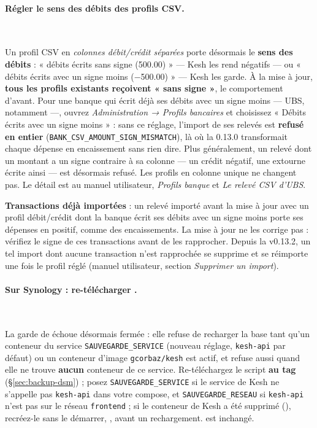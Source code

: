 \documentclass[a4paper,11pt,oneside]{article}
\begin{document}
\paragraph{Régler le sens des débits des profils CSV.}\mbox{}\\
\begin{sloppypar}
Un profil CSV en \emph{colonnes débit/crédit séparées} porte désormais le \textbf{sens des débits} : « débits écrits sans signe (500.00) » --- Kesh les rend négatifs --- ou « débits écrits avec un signe moins (−500.00) » --- Kesh les garde. À la mise à jour, \textbf{tous les profils existants reçoivent « sans signe »}, le comportement d'avant. Pour une banque qui écrit déjà ses débits avec un signe moins --- UBS, notamment ---, ouvrez \emph{Administration → Profils bancaires} et choisissez « Débits écrits avec un signe moins » : sans ce réglage, l'import de ses relevés est \textbf{refusé en entier} (\texttt{BANK\_CSV\_AMOUNT\_SIGN\_MISMATCH}), là où la 0.13.0 transformait chaque dépense en encaissement sans rien dire. Plus généralement, un relevé dont un montant a un signe contraire à sa colonne --- un crédit négatif, une extourne écrite ainsi --- est désormais refusé. Les profils en colonne unique ne changent pas. Le détail est au manuel utilisateur, \emph{Profils banque} et \emph{Le relevé CSV d'UBS}.
\end{sloppypar}

\textbf{Transactions déjà importées} : un relevé importé avant la mise à jour avec un profil débit/crédit dont la banque écrit ses débits avec un signe moins porte ses dépenses en positif, comme des encaissements. La mise à jour ne les corrige pas : vérifiez le signe de ces transactions avant de les rapprocher. Depuis la v0.13.2, un tel import dont aucune transaction n'est rapprochée se supprime et se réimporte une fois le profil réglé (manuel utilisateur, section \emph{Supprimer un import}).

\paragraph{Sur Synology : re-télécharger .}\mbox{}\\
\begin{sloppypar}
La garde de  échoue désormais fermée : elle refuse de recharger la base tant qu'un conteneur du service \texttt{SAUVEGARDE\_SERVICE} (nouveau réglage, \texttt{kesh-api} par défaut) ou un conteneur d'image \texttt{gcorbaz/kesh} est actif, et refuse aussi quand elle ne trouve \textbf{aucun} conteneur de ce service. Re-téléchargez le script \textbf{au tag } (\S\ref{sec:backup-dsm}) ; posez \texttt{SAUVEGARDE\_SERVICE} si le service de Kesh ne s'appelle pas \texttt{kesh-api} dans votre compose, et \texttt{SAUVEGARDE\_RESEAU} si \texttt{kesh-api} n'est pas sur le réseau \texttt{frontend} ; si le conteneur de Kesh a été supprimé (), recréez-le sans le démarrer, , avant un rechargement.  est inchangé.
\end{sloppypar}
\end{document}
